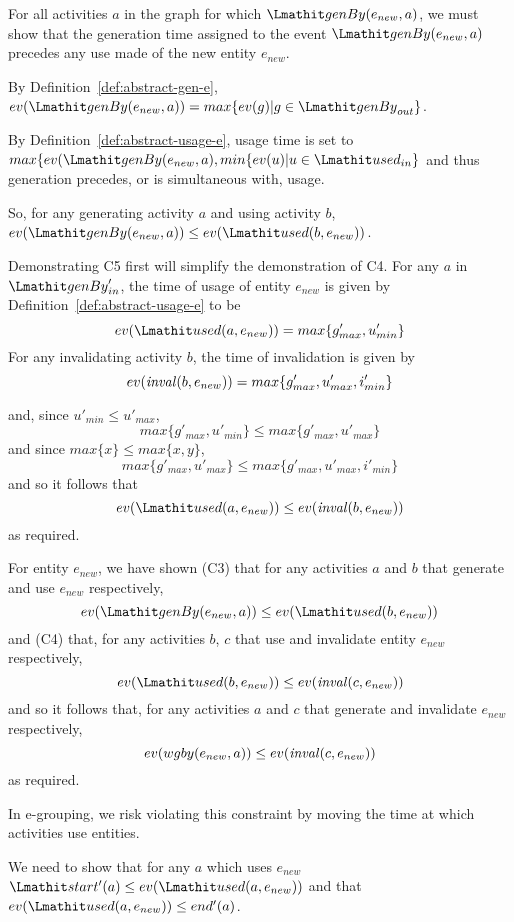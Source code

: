 For all activities $a$ in the graph for which $\wgby(e_{new},a)$, we must show that the generation time assigned to the event $\wgby(e_{new},a)$ precedes any use made of the new entity $e_{new}$.

By Definition~\ref{def:abstract-gen-e}, $ev(\wgby(e_{new},a)) = max\{ev(g)|g\in \wgby_{out}\}$.

By Definition~\ref{def:abstract-usage-e}, usage time is set to $max\{ev(\wgby(e_{new},a), min \{ ev(u) | u \in \used_{in} \}$ and thus generation precedes, or is simultaneous with, usage.

So, for any generating activity $a$ and using activity $b$,  $ev(\wgby(e_{new},a)) \leq ev(\used(b,e_{new}))$.
 



Demonstrating C5 first will simplify the demonstration of C4. 
%
For any $a$ in $\wgby'_{in}$, the time of usage of entity $e_{new}$ is given by Definition~\ref{def:abstract-usage-e} to be 
\[
ev(\used(a,e_{new})) = max\{g'_{max},u'_{min}\}
\]
For any invalidating activity $b$, the time of invalidation is given by
\[
ev(\mathit{inval}(b,e_{new})) = max\{g'_{max},u'_{max},i'_{min}\}
\]


and, since $u'_{min} \leq u'_{max}$, 
\[
max\{g'_{max},u'_{min}\} \leq max\{g'_{max},u'_{max}\}
\]
and since $max\{x\} \leq max\{x,y\}$, 
\[
max\{g'_{max},u'_{max}\} \leq max\{g'_{max},u'_{max},i'_{min}\} 
\]
and so it follows that 
\[
 ev(\used(a,e_{new})) \leq ev(\inv(b,e_{new})) 
\]
as required.


For entity $e_{new}$, we have shown (C3) that for any activities $a$ and $b$ that generate and use $e_{new}$ respectively, 
\[
ev(\wgby(e_{new},a)) \leq ev(\used(b,e_{new}))
\]
and (C4) that, for any activities $b$, $c$ that use and invalidate entity $e_{new}$ respectively,  
\[
ev(\used(b,e_{new})) \leq ev(\inv(c,e_{new}))
\]
and so it follows that, for any activities $a$ and $c$ that generate and invalidate $e_{new}$ respectively,  
\[
ev(wgby(e_{new},a)) \leq ev(\mathit{inval}(c,e_{new}))
\]
as required. 

  In e-grouping, we risk violating this constraint by moving the time at which activities use entities.

We need to show that for any $a$ which uses $e_{new}$ $\start'(a) \leq ev(\used(a,e_{new}))$ and that $ev(\used(a,e_{new}))  \leq end'(a)$.

